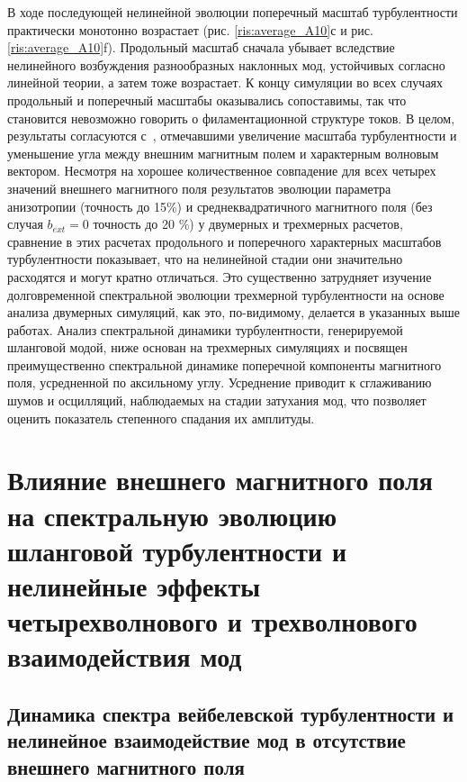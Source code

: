 В ходе последующей нелинейной эволюции поперечный масштаб турбулентности практически монотонно возрастает (рис. \ref{ris:average_A10}с и рис. \ref{ris:average_A10}f). Продольный масштаб сначала убывает вследствие нелинейного возбуждения разнообразных наклонных мод, устойчивых согласно линейной теории, а затем тоже возрастает. К концу симуляции во всех случаях продольный и поперечный масштабы оказывались сопоставимы, так что становится невозможно говорить о филаментационной структуре токов. В целом, результаты согласуются с~\cite{Hellinger2014,Camporeale2008}, отмечавшими увеличение масштаба турбулентности и уменьшение угла между внешним магнитным полем и характерным волновым вектором. Несмотря на хорошее количественное совпадение для всех четырех значений внешнего магнитного поля результатов эволюции параметра анизотропии (точность до 15\%) и среднеквадратичного магнитного поля (без случая $b_{ext}=0$ точность до 20 \%) у двумерных и трехмерных расчетов, сравнение в этих расчетах продольного и поперечного характерных масштабов турбулентности показывает, что на нелинейной стадии они значительно расходятся и могут кратно отличаться.  Это существенно затрудняет изучение долговременной спектральной эволюции трехмерной турбулентности на основе анализа двумерных симуляций, как это, по-видимому, делается в указанных выше работах. Анализ спектральной динамики турбулентности, генерируемой шланговой модой, ниже основан на трехмерных симуляциях и посвящен преимущественно спектральной динамике поперечной компоненты магнитного поля, усредненной по аксильному углу. Усреднение приводит к сглаживанию шумов и осцилляций, наблюдаемых на стадии затухания мод, что позволяет оценить показатель степенного спадания их амплитуды.

\section{Влияние внешнего магнитного поля на спектральную эволюцию шланговой турбулентности и нелинейные эффекты четырехволнового и трехволнового взаимодействия мод}
\subsection{Динамика спектра вейбелевской турбулентности и нелинейное взаимодействие мод в отсутствие внешнего магнитного поля}
\label{part_spectr_bo}


